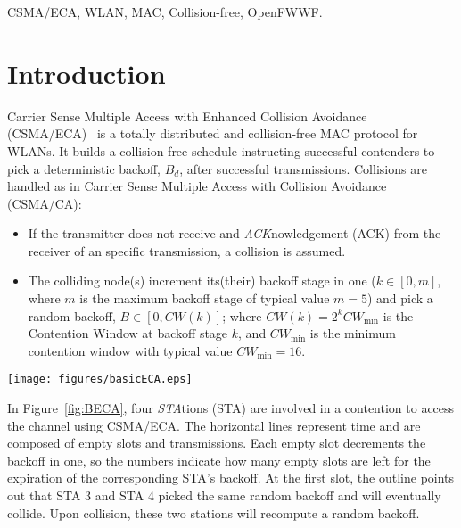 \documentclass[a4paper,journal]{IEEEtran}
\begin{document}
\begin{IEEEkeywords}
CSMA/ECA, WLAN, MAC, Collision-free, OpenFWWF.
\end{IEEEkeywords}

\maketitle

\section{Introduction}\label{intro}
Carrier Sense Multiple Access with Enhanced Collision Avoidance (CSMA/ECA)~\cite{barcelo2008lba} is a totally distributed and collision-free MAC protocol for WLANs. It builds a collision-free schedule instructing successful contenders to pick a deterministic backoff, $B_{d}$, after successful transmissions. Collisions are handled as in Carrier Sense Multiple Access with Collision Avoidance (CSMA/CA):
\begin{itemize}
	\item If the transmitter does not receive and \emph{ACK}nowledgement (ACK) from the receiver of an specific transmission, a collision is assumed.
	\item The colliding node(s) increment its(their) backoff stage in one ($k\in[0,m]$, where $m$ is the maximum backoff stage of typical value $m=5$) and pick a random backoff, $B\in[0,CW(k)]$; where $CW(k)=2^{k}CW_{\min}$ is the Contention Window at backoff stage $k$, and $CW_{\min}$ is the minimum contention window with typical value $CW_{\min}=16$.
\end{itemize}

	\begin{figure*}[tb]
		\centering
		\texttt{[image: figures/basicECA.eps]}
		\caption{CSMA/ECA with four stations in saturation. ($B_{d}=7$.)}
		\label{fig:BECA}
	\end{figure*}


In Figure~\ref{fig:BECA}, four \emph{STA}tions (STA) are involved in a contention to access the channel using CSMA/ECA. The horizontal lines represent time and are composed of empty slots and transmissions. Each empty slot decrements the backoff in one, so the numbers indicate how many empty slots are left for the expiration of the corresponding STA's backoff. At the first slot, the outline points out that STA 3 and STA 4 picked the same random backoff and will eventually collide. Upon collision, these two stations will recompute a random backoff.
\end{document}
